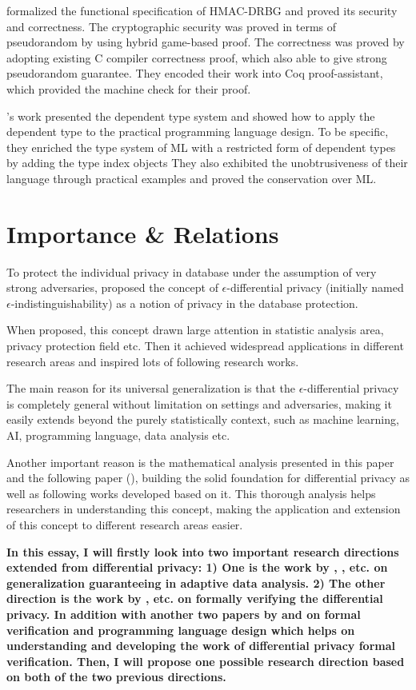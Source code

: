 \documentclass{article}
\begin{document}
\cite{ye2017verified} formalized the functional specification of HMAC-DRBG and proved its security and correctness. The cryptographic security was proved in terms of pseudorandom by using hybrid game-based proof. The correctness was proved by adopting existing C compiler correctness proof, which also able to give strong pseudorandom guarantee. They encoded their work into Coq proof-assistant, which provided the machine check for their proof.


\cite{xi1999dependent}'s work presented the dependent type system and showed how to apply the dependent type to the practical programming language design. To be specific, they enriched the type system of ML with a restricted form of dependent types by adding the type index objects
They also exhibited the unobtrusiveness of their language through practical examples and proved the conservation over ML.


\section{Importance \& Relations}

To protect the individual privacy in database under the assumption of very strong adversaries, \cite{dwork2006calibrating} proposed the concept of $\epsilon$-differential privacy (initially named $\epsilon$-indistinguishability) as a notion of privacy in the database protection.

When proposed, this concept drawn large attention in statistic analysis area, privacy protection field etc. Then it achieved widespread applications in different research areas and inspired lots of following research works.

The main reason for its universal generalization is that the $\epsilon$-differential privacy is completely general without limitation on settings and adversaries, making it easily extends beyond the purely statistically context, such as machine learning, AI, programming language, data analysis etc.

Another important reason is the mathematical analysis presented in this paper and the following paper (\cite{dwork2014algorithmic}), building the solid foundation for differential privacy as well as following works developed based on it. This thorough analysis helps researchers in understanding this concept, making the application and extension of this concept to different research areas easier.

\textbf{In this essay, I will firstly look into two important research directions extended from differential privacy: 1) One is the work by \cite{dwork2015preserving}, \cite{smith2017information}, \cite{jung2019new} etc. on generalization guaranteeing in adaptive data analysis. 2) The other direction is the work by \cite{barthe2016proving}, \cite{near2019duet} etc. on formally verifying the differential privacy. In addition with another two papers by \cite{ye2017verified} and \cite{xi1999dependent} on formal verification and programming language design which helps on understanding and developing the work of differential privacy formal verification. Then, I will propose one possible research direction based on both of the two previous directions.}
\end{document}

